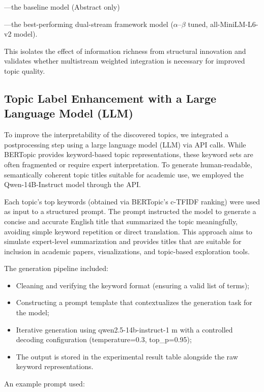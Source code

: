 \documentclass[authorproof,JACIII,researchpaper]{fujipressarticle}
\begin{document}
---the baseline model (Abstract only)

---the best-performing dual-stream framework model ($\alpha$--$\beta$ tuned, all-MiniLM-L6-v2 model).

This isolates the effect of information richness from structural innovation and validates whether multistream weighted integration is necessary for improved topic quality.

\subsection{Topic Label Enhancement with a Large Language Model (LLM)}

To improve the interpretability of the discovered topics, we integrated a postprocessing step using a large language model (LLM) via API calls. While BERTopic provides keyword-based topic representations, these keyword sets are often fragmented or require expert interpretation. To generate human-readable, semantically coherent topic titles suitable for academic use, we employed the Qwen-14B-Instruct model through the API.

Each topic's top keywords (obtained via BERTopic's c-TFIDF ranking) were used as input to a structured prompt. The prompt instructed the model to generate a concise and accurate English title that summarized the topic meaningfully, avoiding simple keyword repetition or direct translation. This approach aims to simulate expert-level summarization and provides titles that are suitable for inclusion in academic papers, visualizations, and topic-based exploration tools.

The generation pipeline included:

\begin{itemize}
    \item Cleaning and verifying the keyword format (ensuring a valid list of terms);
    \item Constructing a prompt template that contextualizes the generation task for the model;
    \item Iterative generation using qwen2.5-14b-instruct-1 m with a controlled decoding configuration (temperature=0.3, top\_p=0.95);
    \item The output is stored in the experimental result table alongside the raw keyword representations.
\end{itemize}

An example prompt used:
\end{document}
